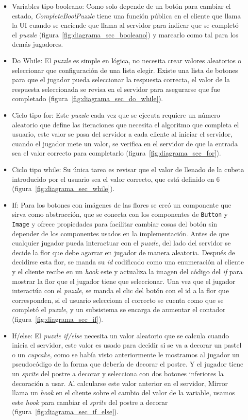 \begin{itemize}
    \item  Variables tipo booleano: Como solo depende de un botón para cambiar el estado, \textit{CompleteBoolPuzzle} tiene una función pública en el cliente que llama la UI cuando se enciende que llama al servidor para indicar que se completó el \textit{puzzle} (figura~\ref{fig:diagrama_sec_booleano}) y marcarlo como tal para los demás jugadores.
    \item Do While: El \textit{puzzle} es simple en lógica, no necesita crear valores aleatorios o seleccionar que configuración de una lista elegir. Existe una lista de botones para que el jugador pueda seleccionar la respuesta correcta, el valor de la respuesta seleccionada se revisa en el servidor para asegurarse que fue completado (figura~\ref{fig:diagrama_sec_do_while}).
    \item Ciclo tipo for: Este \textit{puzzle} cada vez que se ejecuta requiere un número aleatorio que define las iteraciones que necesita el algoritmo que completa el usuario, este valor se pasa del servidor a cada cliente al iniciar el servidor, cuando el jugador mete un valor, se verifica en el servidor de que la entrada sea el valor correcto para completarlo (figura~\ref{fig:diagrama_sec_for}).
    \item Ciclo tipo while: Su única tarea es revisar que el valor de llenado de la cubeta introducido por el usuario sea el valor correcto, que está definido en 6 (figura~\ref{fig:diagrama_sec_while}).
    \item If: Para los botones con imágenes de las flores se creó un componente que sirva como abstracción, que se conecta con los componentes de \texttt{Button} y \texttt{Image} y ofrece propiedades para facilitar cambiar cosas del botón sin depender de los componentes usados en la implementación. 
    Antes de que cualquier jugador pueda interactuar con el \textit{puzzle}, del lado del servidor se decide la flor que debe agarrar en jugador de manera aleatoria. Después de decidirse esta flor, se manda su \textit{id} codificado como una enumeración al cliente y el cliente recibe en un \textit{hook} este y actualiza la imagen del código del \textit{if} para mostrar la flor que el jugador tiene que seleccionar. 
    Una vez que el jugador interactúa con el \textit{puzzle}, se manda el clic del botón con el id a la flor que corresponden, si el usuario selecciona el correcto se cuenta como que se completó el \textit{puzzle}, y un subsistema se encarga de aumentar el contador (figura~\ref{fig:diagrama_sec_if}).
    \item If/else: El \textit{puzzle if/else} necesita un valor aleatorio que se calcula cuando inicia el servidor, este valor es usado para decidir si se va a decorar un pastel o un \textit{cupcake}, como se había visto anteriormente le mostramos al jugador un pseudocódigo de la forma que debería de decorar el postre. Y el jugador tiene un \textit{sprite} del postre a decorar y selecciona con dos botones inferiores la decoración a usar. Al calcularse este valor anterior en el servidor, Mirror llama un \textit{hook} en el cliente sobre el cambio del valor de la variable, usamos este \textit{hook} para cambiar el \textit{sprite} del postre a decorar (figura~\ref{fig:diagrama_sec_if_else}).

\end{itemize}
